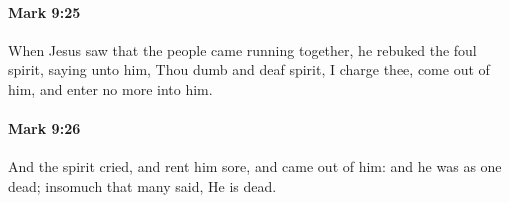 		\paragraph{Mark 9:25} %
			\label{MARK-9-25}

			When Jesus saw that the people came running together, he rebuked the foul spirit, saying unto him, Thou dumb and deaf spirit, I charge thee, come out of him, and enter no more into him.

			\begin{framed}
			\scriptsize
				\begin{compactdesc}
					\item[SBLG] 
				\end{compactdesc}
			\end{framed}

		\paragraph{Mark 9:26} %
			\label{MARK-9-26}

			And the spirit cried, and rent him sore, and came out of him: and he was as one dead; insomuch that many said, He is dead.

